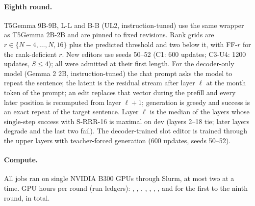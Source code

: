 \paragraph{Eighth round.}
T5Gemma 9B-9B, L-L and B-B (UL2, instruction-tuned) use the same wrapper as T5Gemma 2B-2B and are pinned to fixed revisions. Rank grids
are $r \in \{N-4,\dots,N, 16\}$ plus the predicted threshold and two below it, with FF-$r$ for the rank-deficient $r$. New editors use
seeds 50--52 (C1: 600 updates; C3-U4: 1200 updates, $S \le 4$); all were admitted at their first length. For the decoder-only model
(Gemma 2 2B, instruction-tuned) the chat prompt asks the model to repeat the sentence; the latent is the residual stream after layer
$\ell$ at the month token of the prompt; an edit replaces that vector during the prefill and every later position is recomputed from layer
$\ell+1$; generation is greedy and success is an exact repeat of the target sentence. Layer $\ell$ is the median of the layers whose
single-step success with S-RRR-16 is maximal on dev (layers 2--18 tie; later layers degrade and the last two fail). The decoder-trained
slot editor is trained through the upper layers with teacher-forced generation (600 updates, seeds 50--52).
\paragraph{Compute.}
All jobs ran on single NVIDIA B300 GPUs through Slurm, at most two at a time. GPU hours per round (run ledgers): \CLmetaGpuVone{},
\CLmetaGpuVtwo{}, \CLmetaGpuVthree{}, \CLmetaGpuVfour{}, \CLmetaGpuVfive{}, \CLmetaGpuVsix{}, \CLmetaGpuVseven{}, \CLmetaGpuVeight{} and \CLmetaGpuVnine{} for the first to the ninth round, \CLmetaGpuTotal{} in
total.

